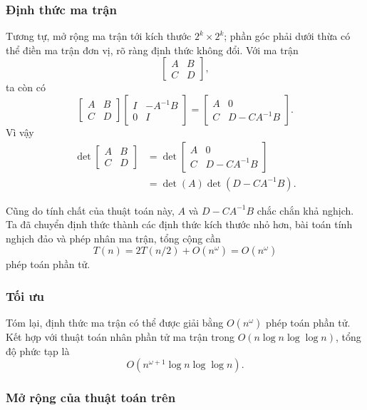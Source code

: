 \documentclass[11pt]{article}
\begin{document}
\subsubsection{Định thức ma trận}

Tương tự, mở rộng ma trận tới kích thước \(2^k\times 2^k\); phần góc phải dưới
thừa có thể điền ma trận đơn vị, rõ ràng định thức không đổi. Với ma trận
\[
  \begin{bmatrix}A&B\\C&D\end{bmatrix},
\]
ta còn có
\[
  \begin{bmatrix}A&B\\C&D\end{bmatrix}
  \begin{bmatrix}I&-A^{-1}B\\0&I\end{bmatrix}
  =
  \begin{bmatrix}A&0\\C&D-CA^{-1}B\end{bmatrix}.
\]
Vì vậy
\[
\begin{aligned}
  \det\begin{bmatrix}A&B\\C&D\end{bmatrix}
  &=
  \det\begin{bmatrix}A&0\\C&D-CA^{-1}B\end{bmatrix}\\
  &=\det(A)\det(D-CA^{-1}B).
\end{aligned}
\]

Cũng do tính chất của thuật toán này, \(A\) và \(D-CA^{-1}B\) chắc chắn khả
nghịch. Ta đã chuyển định thức thành các định thức kích thước nhỏ hơn, bài toán
tính nghịch đảo và phép nhân ma trận, tổng cộng cần
\[
  T(n)=2T(n/2)+O(n^\omega)=O(n^\omega)
\]
phép toán phần tử.

\subsubsection{Tối ưu}

Tóm lại, định thức ma trận có thể được giải bằng \(O(n^\omega)\) phép toán phần
tử. Kết hợp với thuật toán nhân phần tử ma trận trong
\(O(n\log n\log\log n)\), tổng độ phức tạp là
\[
  O(n^{\omega+1}\log n\log\log n).
\]

\subsubsection{Mở rộng của thuật toán trên}
\end{document}
